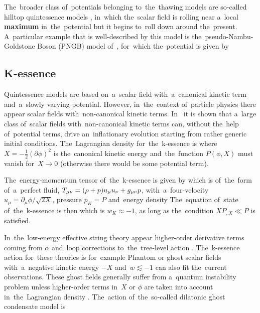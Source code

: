 The~broader class of~potentials belonging to~the~thawing models are so-called hilltop quintessence models \parencite{2008PhRvD..78l3525D}, in~which the~scalar field is rolling near a~local \textbf{maximum} in~the~potential but it begins to~roll down around the~present. A~particular example that is well-described by this model is the~pseudo-Nambu-Goldstone Boson (PNGB) model of~\textcite{1995PhRvL..75.2077F}, for~which the~potential is given by
\subsection{K-essence}
Quintessence models are based on~a~scalar field with~a~canonical kinetic term and~a~slowly varying potential. However, in~the~context of~particle physics there appear scalar fields with~non-canonical kinetic terms. In~\textcite{1999PhLB..458..209A} it is shown that a~large class of~scalar fields with~non-canonical kinetic terms can, without the~help of~potential terms, drive an~inflationary evolution starting from rather generic initial conditions. The~Lagrangian density for~the~k-essence is
where $X=-\frac12(\partial\phi)^2$ is the~canonical kinetic energy and~the~function $P(\phi, X)$ must vanish for~$X\rightarrow0$ (otherwise there would be some potential term). 

The~energy-momentum tensor of~the~k-essence is given by
which is of~the~form of~a~perfect fluid, $T_{\mu\nu}=(\rho+p)u_\mu u_\nu+g_{\mu\nu} p$, with~a~four-velocity $u_\mu=\partial_\mu\phi/\sqrt{2X}$, pressure $p_K=P$ and~energy density
The~equation of~state of~the~k-essence is then
which is $w_K\approx-1$, as long as the~condition $XP_{,X}\ll P$ is satisfied.

In~the~low-energy effective string theory appear higher-order derivative terms coming from $\alpha$ and~loop corrections to~the~tree-level action \parencite{2003PhR...373....1G}. The~k-essence action for~these theories is for~example
Phantom or ghost scalar fields with~a~negative kinetic energy $-X$ and~$w\lesssim-1$ can also fit the~current observations. These ghost fields generally suffer from a~quantum instability problem unless higher-order terms in~$X$ or $\phi$ are taken into account in~the~Lagrangian density \parencite{2010deto.book.....A}. The~action of~the~so-called dilatonic ghost condensate model is \parencite{2004JCAP...07..004P}
